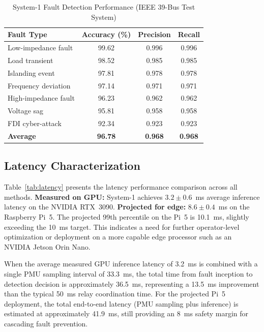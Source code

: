 \documentclass[journal]{IEEEtran}
\begin{document}
\begin{table}[!t]
\centering
\caption{System-1 Fault Detection Performance (IEEE 39-Bus Test System)}
\label{tab:accuracy}
\begin{tabular}{lccc}
\toprule
\textbf{Fault Type} & \textbf{Accuracy (\%)} & \textbf{Precision} & \textbf{Recall} \\
\midrule
Low-impedance fault & 99.62 & 0.996 & 0.996 \\
Load transient       & 98.52 & 0.985 & 0.985 \\
Islanding event      & 97.81 & 0.978 & 0.978 \\
Frequency deviation  & 97.14 & 0.971 & 0.971 \\
High-impedance fault & 96.23 & 0.962 & 0.962 \\
Voltage sag          & 95.81 & 0.958 & 0.958 \\
FDI cyber-attack     & 92.34 & 0.923 & 0.923 \\
\midrule
\textbf{Average}     & \textbf{96.78} & \textbf{0.968} & \textbf{0.968} \\
\bottomrule
\end{tabular}
\end{table}

\subsection{Latency Characterization}

Table~\ref{tab:latency} presents the latency performance comparison across all methods. \textbf{Measured on GPU:} System-1 achieves $3.2 \pm 0.6$~ms average inference latency on the NVIDIA RTX~3090. \textbf{Projected for edge:} $8.6 \pm 0.4$~ms on the Raspberry Pi~5. The projected 99th percentile on the Pi~5 is 10.1~ms, slightly exceeding the 10~ms target. This indicates a need for further operator-level optimization or deployment on a more capable edge processor such as an NVIDIA Jetson Orin Nano.

When the average measured GPU inference latency of 3.2~ms is combined with a single PMU sampling interval of 33.3~ms, the total time from fault inception to detection decision is approximately 36.5~ms, representing a 13.5~ms improvement than the typical 50~ms relay coordination time. For the projected Pi~5 deployment, the total end-to-end latency (PMU sampling plus inference) is estimated at approximately 41.9~ms, still providing an 8~ms safety margin for cascading fault prevention.
\end{document}
